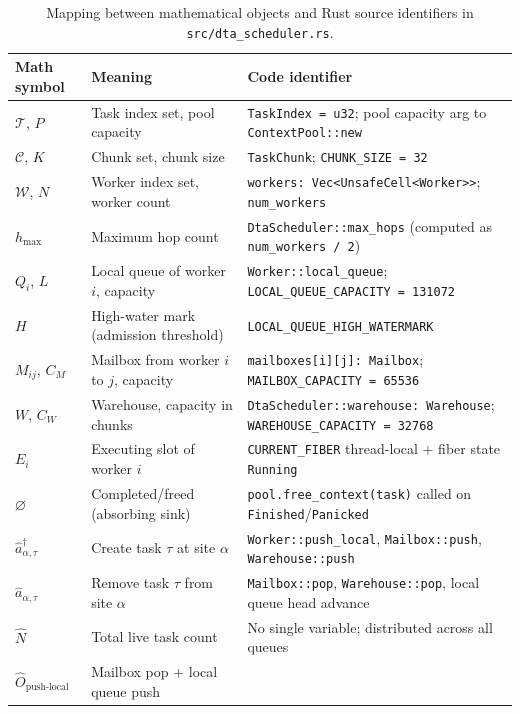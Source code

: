 \documentclass[11pt,a4paper]{article}
\newcommand{\cre}[1]{\hat{a}^{\dagger}_{#1}}
\newcommand{\ann}[1]{\hat{a}_{#1}}
\newcommand{\Num}{\hat{N}}
\newcommand{\code}[1]{\texttt{#1}}
\begin{document}
\begin{table}[H]
\centering
\small
\caption{Mapping between mathematical objects and Rust source identifiers
in \texttt{src/dta\_scheduler.rs}.}
\label{tab:corr}
\begin{tabular}{>{\ttfamily}p{3.4cm} p{4.5cm} p{5.5cm}}
\toprule
\normalfont Math symbol & Meaning & Code identifier \\
\midrule
$\mathcal{T}$, $P$   & Task index set, pool capacity
  & \code{TaskIndex = u32}; pool capacity arg to \code{ContextPool::new} \\
$\mathcal{C}$, $K$   & Chunk set, chunk size
  & \code{TaskChunk}; \code{CHUNK\_SIZE = 32} \\
$\mathcal{W}$, $N$   & Worker index set, worker count
  & \code{workers: Vec<UnsafeCell<Worker>>}; \code{num\_workers} \\
$h_{\max}$           & Maximum hop count
  & \code{DtaScheduler::max\_hops} (computed as \code{num\_workers / 2}) \\
$Q_i$, $L$           & Local queue of worker $i$, capacity
  & \code{Worker::local\_queue}; \code{LOCAL\_QUEUE\_CAPACITY = 131072} \\
$H$                  & High-water mark (admission threshold)
  & \code{LOCAL\_QUEUE\_HIGH\_WATERMARK} \\
$M_{ij}$, $C_M$      & Mailbox from worker $i$ to $j$, capacity
  & \code{mailboxes[i][j]: Mailbox}; \code{MAILBOX\_CAPACITY = 65536} \\
$W$, $C_W$           & Warehouse, capacity in chunks
  & \code{DtaScheduler::warehouse: Warehouse}; \code{WAREHOUSE\_CAPACITY = 32768} \\
$E_i$                & Executing slot of worker $i$
  & \code{CURRENT\_FIBER} thread-local + fiber state \code{Running} \\
$\varnothing$        & Completed/freed (absorbing sink)
  & \code{pool.free\_context(task)} called on \code{Finished}/\code{Panicked} \\
$\cre{\alpha,\tau}$  & Create task $\tau$ at site $\alpha$
  & \code{Worker::push\_local}, \code{Mailbox::push}, \code{Warehouse::push} \\
$\ann{\alpha,\tau}$  & Remove task $\tau$ from site $\alpha$
  & \code{Mailbox::pop}, \code{Warehouse::pop}, local queue head advance \\
$\Num$               & Total live task count
  & No single variable; distributed across all queues \\
$\hat{O}_{\text{push-local}}$ & Mailbox pop + local queue push

\end{tabular}
\end{table}
\end{document}
